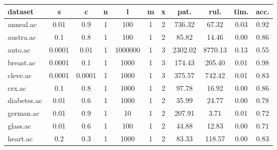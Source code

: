 \begin{table}[htbp]
	\centering
		\begin{tabular}{|l|c|c|c|c|c|c||c|c|c|c|}
		\hline
		\textbf{dataset}	& \textbf{s}	& \textbf{c}	& \textbf{n}	& \textbf{l}	& \textbf{m}	& \textbf{x}	& \textbf{pat.}	& \textbf{rul.}	& \textbf{tim.}	& \textbf{acc.}	\\
		\hline
		anneal.ac      & 0.01     & 0.9         & 1              & 100                 & 1             & 2             & 736.32         & 67.32          & 0.03           & 0.92           \\
		\hline
		austra.ac      & 0.1      & 0.8         & 1              & 100                 & 1             & 2             & 85.82          & 14.46          & 0.00           & 0.86           \\
		\hline
		auto.ac        & 0.0001   & 0.01        & 1              & 1000000             & 1             & 3             & 2302.02        & 8770.13        & 0.13           & 0.55           \\
		\hline
		breast.ac      & 0.0001   & 0.1         & 1              & 1000                & 1             & 3             & 174.43         & 205.40         & 0.01           & 0.98           \\
		\hline
		cleve.ac       & 0.0001   & 0.0001      & 1              & 1000                & 1             & 3             & 375.57         & 742.42         & 0.01           & 0.83           \\
		\hline
		crx.ac         & 0.1      & 0.8         & 1              & 1000                & 1             & 2             & 97.78          & 16.92          & 0.00           & 0.86           \\
		\hline
		diabetes.ac    & 0.01     & 0.6         & 1              & 1000                & 1             & 2             & 35.99          & 24.77          & 0.00           & 0.78           \\
		\hline
		german.ac      & 0.01     & 0.9         & 1              & 10                  & 1             & 2             & 207.91         & 3.71           & 0.01           & 0.72           \\
		\hline
		glass.ac       & 0.01     & 0.6         & 1              & 100                 & 1             & 2             & 44.88          & 12.83          & 0.00           & 0.71           \\
		\hline
		heart.ac       & 0.2      & 0.3         & 1              & 1000                & 1             & 2             & 83.33          & 118.57         & 0.00           & 0.83           \\

\end{tabular}
\end{table}
